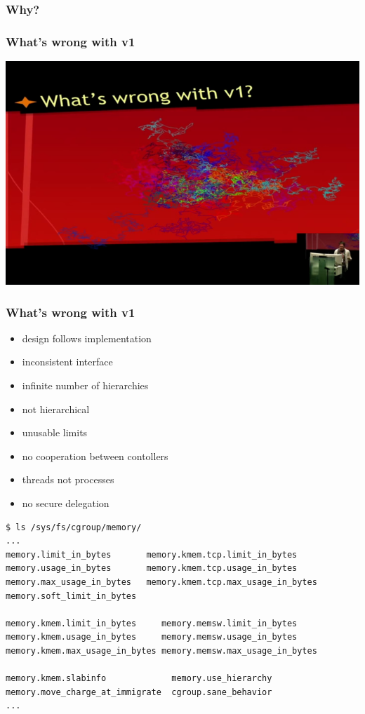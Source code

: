\documentclass[serif]{beamer}
\begin{document}
\begin{frame}
  \frametitle{Why?}

\end{frame}

\begin{frame}
  \frametitle{What's wrong with v1}

  \includegraphics[width=\textwidth]{images/whats-wrong.png}
\end{frame}

\begin{frame}
  \frametitle{What's wrong with v1}

  \begin{itemize}
  \item design follows implementation \pause
  \item inconsistent interface \pause
  \item infinite number of hierarchies \pause
  \item not hierarchical \pause
  \item unusable limits \pause
  \item no cooperation between contollers\pause
  \item threads not processes \pause
  \item no secure delegation
  \end{itemize}
\end{frame}

\begin{frame}[fragile]
\begin{adjustwidth}{-1.5em}{-1.5em}
\begin{verbatim}
$ ls /sys/fs/cgroup/memory/
...
memory.limit_in_bytes       memory.kmem.tcp.limit_in_bytes
memory.usage_in_bytes       memory.kmem.tcp.usage_in_bytes
memory.max_usage_in_bytes   memory.kmem.tcp.max_usage_in_bytes
memory.soft_limit_in_bytes

memory.kmem.limit_in_bytes     memory.memsw.limit_in_bytes
memory.kmem.usage_in_bytes     memory.memsw.usage_in_bytes
memory.kmem.max_usage_in_bytes memory.memsw.max_usage_in_bytes

memory.kmem.slabinfo             memory.use_hierarchy
memory.move_charge_at_immigrate  cgroup.sane_behavior
...
\end{verbatim}
\end{adjustwidth}
\end{frame}
\end{document}
